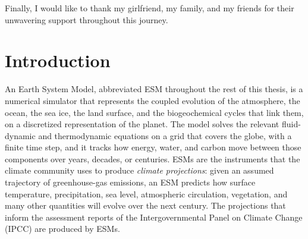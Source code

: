 \documentclass[12pt,a4paper]{article}
\begin{document}
Finally, I would like to thank my girlfriend, my family, and my friends for their unwavering
support throughout this journey.

\newpage

\tableofcontents
\newpage


\let\oldsection\section
\renewcommand{\section}{\clearpage\oldsection}

\section{Introduction}

An Earth System Model, abbreviated ESM throughout the rest of this thesis, is a numerical
simulator that represents the coupled evolution of the atmosphere, the ocean, the sea ice,
the land surface, and the biogeochemical cycles that link them, on a discretized
representation of the planet. The model solves the relevant fluid-dynamic and thermodynamic
equations on a grid that covers the globe, with a finite time step, and it tracks how energy,
water, and carbon move between those components over years, decades, or centuries. ESMs are
the instruments that the climate community uses to produce \emph{climate projections}: given
an assumed trajectory of greenhouse-gas emissions, an ESM predicts how surface temperature,
precipitation, sea level, atmospheric circulation, vegetation, and many other quantities will
evolve over the next century. The projections that inform the assessment reports of the
Intergovernmental Panel on Climate Change (IPCC) are produced by ESMs.
\end{document}
